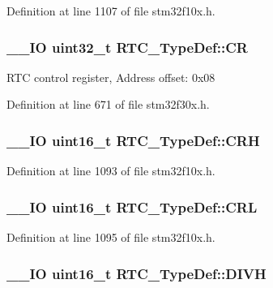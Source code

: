 Definition at line 1107 of file stm32f10x.\-h.

\hypertarget{struct_r_t_c___type_def_a731d9209ce40dce6ea61fcc6f818c892}{
\subsubsection[{C\-R}]{\setlength{\rightskip}{0pt plus 5cm}\-\_\-\-\_\-\-I\-O {\bf uint32\-\_\-t} R\-T\-C\-\_\-\-Type\-Def\-::\-C\-R}}\label{struct_r_t_c___type_def_a731d9209ce40dce6ea61fcc6f818c892}
R\-T\-C control register, Address offset\-: 0x08 

Definition at line 671 of file stm32f30x.\-h.

\hypertarget{struct_r_t_c___type_def_aad5162f4b5b15deb174479e8e543db82}{
\subsubsection[{C\-R\-H}]{\setlength{\rightskip}{0pt plus 5cm}\-\_\-\-\_\-\-I\-O {\bf uint16\-\_\-t} R\-T\-C\-\_\-\-Type\-Def\-::\-C\-R\-H}}\label{struct_r_t_c___type_def_aad5162f4b5b15deb174479e8e543db82}


Definition at line 1093 of file stm32f10x.\-h.

\hypertarget{struct_r_t_c___type_def_a95b9e1ed044a4e1cc3632326e7250767}{
\subsubsection[{C\-R\-L}]{\setlength{\rightskip}{0pt plus 5cm}\-\_\-\-\_\-\-I\-O {\bf uint16\-\_\-t} R\-T\-C\-\_\-\-Type\-Def\-::\-C\-R\-L}}\label{struct_r_t_c___type_def_a95b9e1ed044a4e1cc3632326e7250767}


Definition at line 1095 of file stm32f10x.\-h.

\hypertarget{struct_r_t_c___type_def_a224b675d0ecad8b6e26d9e4c32691a18}{
\subsubsection[{D\-I\-V\-H}]{\setlength{\rightskip}{0pt plus 5cm}\-\_\-\-\_\-\-I\-O {\bf uint16\-\_\-t} R\-T\-C\-\_\-\-Type\-Def\-::\-D\-I\-V\-H}}\label{struct_r_t_c___type_def_a224b675d0ecad8b6e26d9e4c32691a18}



